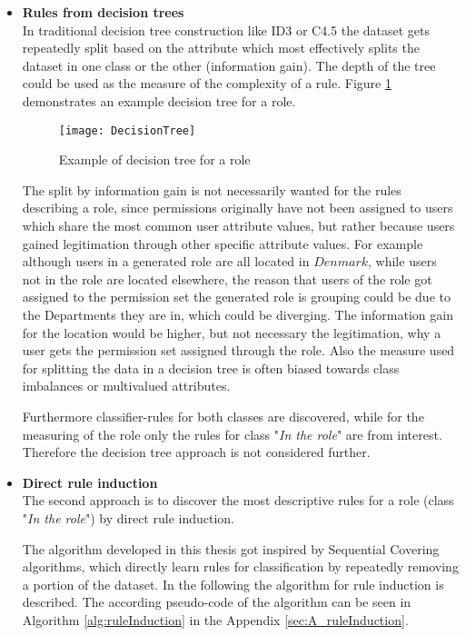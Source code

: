         \begin{itemize}
        	\item \textbf{Rules from decision trees}\\
        	In traditional decision tree construction like ID3 or C4.5 the dataset gets repeatedly split based on the attribute which most effectively splits the dataset in one class or the other (information gain). The depth of the tree could be used as the measure of the complexity of a rule. Figure \ref{fig:decisionTree} demonstrates an example decision tree for a role.
        	
        	\begin{figure}[H]
        		\centering
        	 	\texttt{[image: DecisionTree]}
        	 	\caption{Example of decision tree for a role}
        	 	\label{fig:decisionTree}
        	\end{figure}
        	
        	The split by information gain is not necessarily wanted for the rules describing a role, since permissions originally have not been assigned to users which share the most common user attribute values, but rather because users gained legitimation through other specific attribute values. For example although users in a generated role are all located in $Denmark$, while users not in the role are located elsewhere, the reason that users of the role got assigned to the permission set the generated role is grouping could be due to the Departments they are in, which could be diverging. The information gain for the location would be higher, but not necessary the legitimation, why a user gets the permission set assigned through the role. Also the measure used for splitting the data in a decision tree is often biased towards class imbalances or multivalued attributes\cite{Han}.
        	
        	Furthermore classifier-rules for both classes are discovered, while for the measuring of the role only the rules for class "\textit{In the role}" are from interest. Therefore the decision tree approach is not considered further.
        	
        	\item \textbf{Direct rule induction}\\
        	The second approach is to discover the most descriptive rules for a role (class "\textit{In the role}") by direct rule induction.
        	
        	The algorithm developed in this thesis got inspired by Sequential Covering algorithms, which directly learn rules for classification by repeatedly removing a portion of the dataset. In the following the algorithm for rule induction is described. The according pseudo-code of the algorithm can be seen in Algorithm \ref{alg:ruleInduction} in the Appendix \ref{sec:A_ruleInduction}.
        	

\end{itemize}
